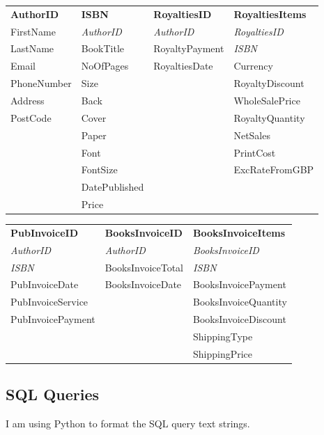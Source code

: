\begin{tabular}{|p{2.5cm}|p{2.5cm}|p{2.5cm}|p{3cm}|}
    \hline
    \textbf{AuthorID} & \textbf{ISBN} & \textbf{RoyaltiesID} & \textbf{RoyaltiesItems} \\
    FirstName & \emph{AuthorID} & \emph{AuthorID} & \emph{RoyaltiesID} \\
    LastName & BookTitle & RoyaltyPayment & \emph{ISBN}  \\
    Email & NoOfPages & RoyaltiesDate & Currency  \\
    PhoneNumber & Size & & RoyaltyDiscount  \\
    Address & Back & & WholeSalePrice \\
    PostCode & Cover & & RoyaltyQuantity  \\
    & Paper & & NetSales \\
    & Font & & PrintCost \\
    & FontSize & & ExcRateFromGBP \\
    & DatePublished & & \\
    & Price & & \\
    \hline
\end{tabular}

\begin{tabular}{|p{3cm}|p{3.5cm}|p{3.5cm}|}
    \hline
    \textbf{PubInvoiceID} & \textbf{BooksInvoiceID} & \textbf{BooksInvoiceItems} \\
    \emph{AuthorID} & \emph{AuthorID} & \emph{BooksInvoiceID} \\
    \emph{ISBN}& BooksInvoiceTotal & \emph{ISBN} \\
    PubInvoiceDate & BooksInvoiceDate & BooksInvoicePayment \\
    PubInvoiceService & & BooksInvoiceQuantity \\
    PubInvoicePayment & & BooksInvoiceDiscount \\
    & & ShippingType \\
    & & ShippingPrice \\
    \hline
\end{tabular}

\subsection{SQL Queries}

I am using Python to format the SQL query text strings.

